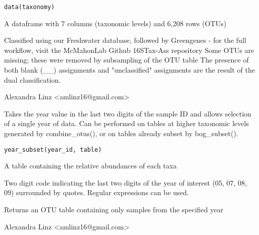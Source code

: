 \documentclass[a4paper]{book}
\begin{document}
%
\begin{Usage}
\begin{verbatim}
data(taxonomy)
\end{verbatim}
\end{Usage}
%
\begin{Format}
A dataframe with 7 columns (taxonomic levels) and 6,208 rows	(OTUs)
\end{Format}
%
\begin{Details}\relax
Classified using our Freshwater database, followed by Greengenes - for the full workflow, visit the McMahonLab Github 16STax-Ass repository
Some OTUs are missing; these were removed by subsampling of the OTU table
The presence of both blank (\_\_) assignments and "unclassified" assignments are the result of the dual classification.
\end{Details}
%
\begin{Author}\relax
Alexandra Linz <amlinz16@gmail.com>
\end{Author}
%
\begin{Description}\relax
Takes the year value in the last two digits of the sample ID and allows selection of a single year of data. Can be performed on tables at higher taxonomic levels generated by combine\_otus(), or on tables already subset by bog\_subset().
\end{Description}
%
\begin{Usage}
\begin{verbatim}
year_subset(year_id, table)
\end{verbatim}
\end{Usage}
%
\begin{Arguments}
\begin{ldescription}
\item[\code{table}] 
A table containing the relative abundances of each taxa

\item[\code{year\_id}] 
Two digit code indicating the last two digits of the year of interest (05, 07, 08, 09) surrounded by quotes. Regular expressions can be used.

\end{ldescription}
\end{Arguments}
%
\begin{Value}
Returns an OTU table containing only samples from the specified year
\end{Value}
%
\begin{Author}\relax
Alexandra Linz <amlinz16@gmail.com>
\end{Author}
\end{document}
